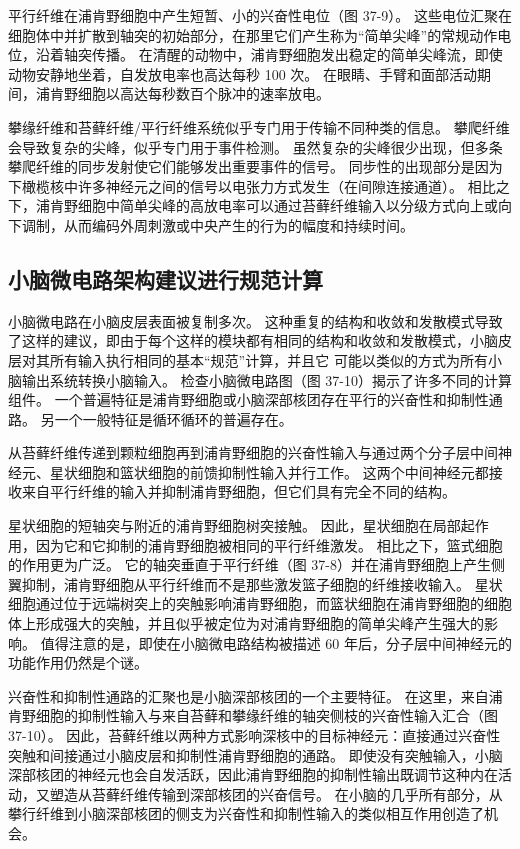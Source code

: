 平行纤维在浦肯野细胞中产生短暂、小的兴奋性电位（图 37-9）。 这些电位汇聚在细胞体中并扩散到轴突的初始部分，在那里它们产生称为“简单尖峰”的常规动作电位，沿着轴突传播。 在清醒的动物中，浦肯野细胞发出稳定的简单尖峰流，即使动物安静地坐着，自发放电率也高达每秒 100 次。 在眼睛、手臂和面部活动期间，浦肯野细胞以高达每秒数百个脉冲的速率放电。

攀缘纤维和苔藓纤维/平行纤维系统似乎专门用于传输不同种类的信息。 攀爬纤维会导致复杂的尖峰，似乎专门用于事件检测。 虽然复杂的尖峰很少出现，但多条攀爬纤维的同步发射使它们能够发出重要事件的信号。 同步性的出现部分是因为下橄榄核中许多神经元之间的信号以电张力方式发生（在间隙连接通道）。 相比之下，浦肯野细胞中简单尖峰的高放电率可以通过苔藓纤维输入以分级方式向上或向下调制，从而编码外周刺激或中央产生的行为的幅度和持续时间。

\subsection{小脑微电路架构建议进行规范计算}
小脑微电路在小脑皮层表面被复制多次。 这种重复的结构和收敛和发散模式导致了这样的建议，即由于每个这样的模块都有相同的结构和收敛和发散模式，小脑皮层对其所有输入执行相同的基本“规范”计算，并且它 可能以类似的方式为所有小脑输出系统转换小脑输入。 检查小脑微电路图（图 37-10）揭示了许多不同的计算组件。 一个普遍特征是浦肯野细胞或小脑深部核团存在平行的兴奋性和抑制性通路。 另一个一般特征是循环循环的普遍存在。

从苔藓纤维传递到颗粒细胞再到浦肯野细胞的兴奋性输入与通过两个分子层中间神经元、星状细胞和篮状细胞的前馈抑制性输入并行工作。 这两个中间神经元都接收来自平行纤维的输入并抑制浦肯野细胞，但它们具有完全不同的结构。

星状细胞的短轴突与附近的浦肯野细胞树突接触。 因此，星状细胞在局部起作用，因为它和它抑制的浦肯野细胞被相同的平行纤维激发。 相比之下，篮式细胞的作用更为广泛。 它的轴突垂直于平行纤维（图 37-8）并在浦肯野细胞上产生侧翼抑制，浦肯野细胞从平行纤维而不是那些激发篮子细胞的纤维接收输入。 星状细胞通过位于远端树突上的突触影响浦肯野细胞，而篮状细胞在浦肯野细胞的细胞体上形成强大的突触，并且似乎被定位为对浦肯野细胞的简单尖峰产生强大的影响。 值得注意的是，即使在小脑微电路结构被描述 60 年后，分子层中间神经元的功能作用仍然是个谜。

兴奋性和抑制性通路的汇聚也是小脑深部核团的一个主要特征。 在这里，来自浦肯野细胞的抑制性输入与来自苔藓和攀缘纤维的轴突侧枝的兴奋性输入汇合（图 37-10）。 因此，苔藓纤维以两种方式影响深核中的目标神经元：直接通过兴奋性突触和间接通过小脑皮层和抑制性浦肯野细胞的通路。 即使没有突触输入，小脑深部核团的神经元也会自发活跃，因此浦肯野细胞的抑制性输出既调节这种内在活动，又塑造从苔藓纤维传输到深部核团的兴奋信号。 在小脑的几乎所有部分，从攀行纤维到小脑深部核团的侧支为兴奋性和抑制性输入的类似相互作用创造了机会。

